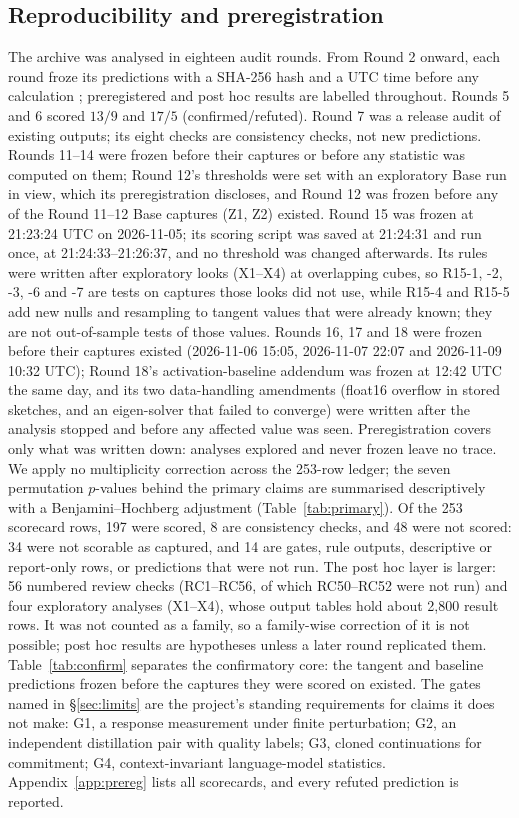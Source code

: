 \documentclass[11pt]{article}
\begin{document}
\subsection{Reproducibility and preregistration}
The archive was analysed in eighteen audit rounds. From Round 2 onward, each round froze its predictions with a SHA-256 hash and a UTC time before any calculation \citep{nosek2018preregistration,simmons2011false}; preregistered and post hoc results are labelled throughout. Rounds 5 and 6 scored $13/9$ and $17/5$ (confirmed/refuted). Round 7 was a release audit of existing outputs; its eight checks are consistency checks, not new predictions. Rounds 11--14 were frozen before their captures or before any statistic was computed on them; Round 12's thresholds were set with an exploratory Base run in view, which its preregistration discloses, and Round 12 was frozen before any of the Round 11--12 Base captures (Z1, Z2) existed. Round 15 was frozen at 21:23:24 UTC on 2026-11-05; its scoring script was saved at 21:24:31 and run once, at 21:24:33--21:26:37, and no threshold was changed afterwards. Its rules were written after exploratory looks (X1--X4) at overlapping cubes, so R15-1, -2, -3, -6 and -7 are tests on captures those looks did not use, while R15-4 and R15-5 add new nulls and resampling to tangent values that were already known; they are not out-of-sample tests of those values. Rounds 16, 17 and 18 were frozen before their captures existed (2026-11-06 15:05, 2026-11-07 22:07 and 2026-11-09 10:32 UTC); Round 18's activation-baseline addendum was frozen at 12:42 UTC the same day, and its two data-handling amendments (float16 overflow in stored sketches, and an eigen-solver that failed to converge) were written after the analysis stopped and before any affected value was seen. Preregistration covers only what was written down: analyses explored and never frozen leave no trace. We apply no multiplicity correction across the 253-row ledger; the seven permutation $p$-values behind the primary claims are summarised descriptively with a Benjamini--Hochberg adjustment (Table~\ref{tab:primary}). Of the 253 scorecard rows, 197 were scored, 8 are consistency checks, and 48 were not scored: 34 were not scorable as captured, and 14 are gates, rule outputs, descriptive or report-only rows, or predictions that were not run. The post hoc layer is larger: 56 numbered review checks (RC1--RC56, of which RC50--RC52 were not run) and four exploratory analyses (X1--X4), whose output tables hold about 2{,}800 result rows. It was not counted as a family, so a family-wise correction of it is not possible; post hoc results are hypotheses unless a later round replicated them. Table~\ref{tab:confirm} separates the confirmatory core: the tangent and baseline predictions frozen before the captures they were scored on existed. The gates named in \S\ref{sec:limits} are the project's standing requirements for claims it does not make: G1, a response measurement under finite perturbation; G2, an independent distillation pair with quality labels; G3, cloned continuations for commitment; G4, context-invariant language-model statistics. Appendix~\ref{app:prereg} lists all scorecards, and every refuted prediction is reported.
\end{document}
